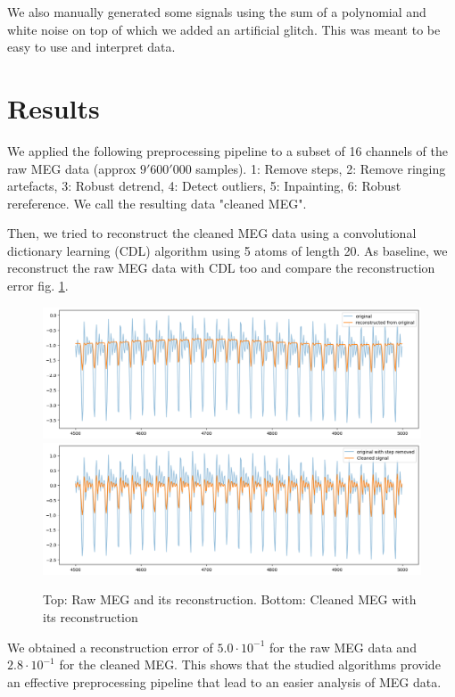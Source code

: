 \documentclass[11pt]{article}
\begin{document}
We also manually generated some signals using the sum of a polynomial and white noise on top of which we added an artificial glitch. This was meant to be easy to use and interpret data.\\ 

\section{Results}

We applied the following preprocessing pipeline to a subset of 16 channels of the raw MEG data (approx $9'600'000$ samples). 1: Remove steps, 2: Remove ringing artefacts, 3: Robust detrend, 4: Detect outliers, 5: Inpainting, 6: Robust rereference. We call the resulting data "cleaned MEG".

Then, we tried to reconstruct the cleaned MEG data using a convolutional dictionary learning (CDL) algorithm using 5 atoms of length 20. As baseline, we reconstruct the raw MEG data with CDL too and compare the reconstruction error fig. \ref{fig:recons}.

\begin{figure}
    \centering
    \includegraphics[width=12cm]{recons.png}\\
    \includegraphics[width=12cm]{recons_clean.png}
    \caption{Top: Raw MEG and its reconstruction. Bottom: Cleaned MEG with its reconstruction}
    \label{fig:recons}
\end{figure}

We obtained a reconstruction error of $5.0\cdot 10^{-1}$ for the raw MEG data and $2.8\cdot 10^{-1}$ for the cleaned MEG. This shows that the studied algorithms provide an effective preprocessing pipeline that lead to an easier analysis of MEG data.

\newpage

\printbibliography[heading=bibintoc]
\end{document}
